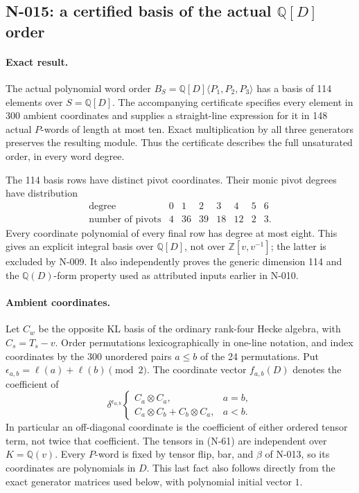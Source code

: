 \subsection{N-015: a certified basis of the actual $\mathbb Q[D]$ order}
\label{sec:nonstandard-polynomial-order}

\paragraph{Exact result.}
The actual polynomial word order
$B_S=\mathbb Q[D]\langle P_1,P_2,P_3\rangle$ has a basis of
114 elements over $S=\mathbb Q[D]$.  The accompanying certificate
specifies every element in 300 ambient coordinates and supplies
a straight-line expression for it in 148 actual $P$-words of
length at most ten.  Exact multiplication by all three
generators preserves the resulting module.  Thus the certificate
describes the full unsaturated order, in every word degree.

The 114 basis rows have distinct pivot coordinates.  Their
monic pivot degrees have distribution
\[
\begin{array}{c|rrrrrrr}
\text{degree}&0&1&2&3&4&5&6\\\hline
\text{number of pivots}&4&36&39&18&12&2&3.
\end{array}
 \tag{N-60}
\]
Every coordinate polynomial of every final row has degree at
most eight.  This gives an explicit integral basis over
$\mathbb Q[D]$, not over $\mathbb Z[v,v^{-1}]$; the latter
is excluded by N-009.  It also independently proves the
generic dimension 114 and the $\mathbb Q(D)$-form property
used as attributed inputs earlier in N-010.

\paragraph{Ambient coordinates.}
Let $C_w$ be the opposite KL basis of the ordinary rank-four
Hecke algebra, with $C_s=T_s-v$.  Order permutations
lexicographically in one-line notation, and index coordinates
by the 300 unordered pairs $a\le b$ of the 24 permutations.
Put $\epsilon_{a,b}=\ell(a)+\ell(b)\pmod2$.  The coordinate
vector $f_{a,b}(D)$ denotes the coefficient of
\[
 \delta^{\epsilon_{a,b}}\begin{cases}
 C_a\otimes C_a,&a=b,\\
 C_a\otimes C_b+C_b\otimes C_a,&a<b.
 \end{cases}
 \tag{N-61}
\]
In particular an off-diagonal coordinate is the coefficient
of either ordered tensor term, not twice that coefficient.
The tensors in (N-61) are independent over $K=\mathbb Q(v)$.
Every $P$-word is fixed by tensor flip, bar, and $\beta$ of
N-013, so its coordinates are polynomials in $D$.  This last
fact also follows directly from the exact generator matrices
used below, with polynomial initial vector $1$.

